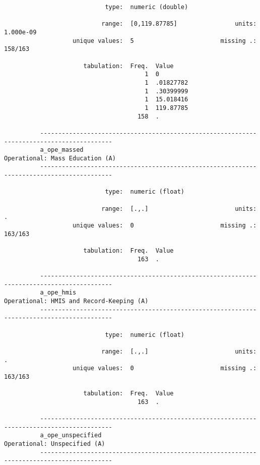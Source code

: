 \documentclass{article}
\begin{document}
\begin{verbatim}
                            type:  numeric (double)
          
                           range:  [0,119.87785]                units:  1.000e-09
                   unique values:  5                        missing .:  158/163
          
                      tabulation:  Freq.  Value
                                       1  0
                                       1  .01827782
                                       1  .30399999
                                       1  15.018416
                                       1  119.87785
                                     158  .
          
          ------------------------------------------------------------------------------------------
          a_ope_massed                                               Operational: Mass Education (A)
          ------------------------------------------------------------------------------------------
          
                            type:  numeric (float)
          
                           range:  [.,.]                        units:  .
                   unique values:  0                        missing .:  163/163
          
                      tabulation:  Freq.  Value
                                     163  .
          
          ------------------------------------------------------------------------------------------
          a_ope_hmis                                        Operational: HMIS and Record-Keeping (A)
          ------------------------------------------------------------------------------------------
          
                            type:  numeric (float)
          
                           range:  [.,.]                        units:  .
                   unique values:  0                        missing .:  163/163
          
                      tabulation:  Freq.  Value
                                     163  .
          
          ------------------------------------------------------------------------------------------
          a_ope_unspecified                                             Operational: Unspecified (A)
          ------------------------------------------------------------------------------------------
          

\end{verbatim}
\end{document}
